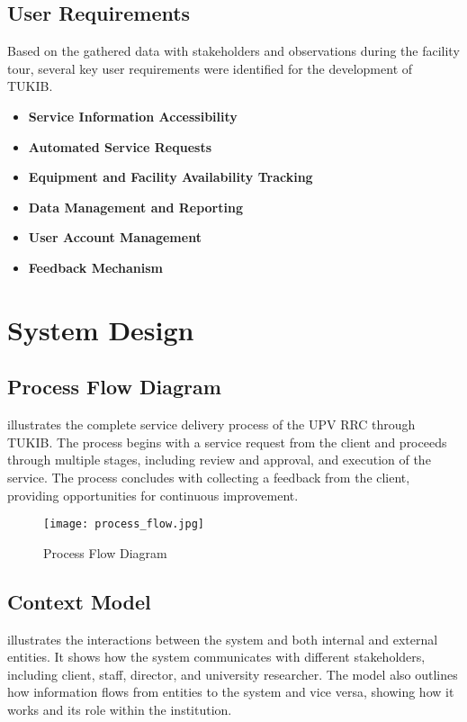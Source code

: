 \subsection{User Requirements}

Based on the gathered data with stakeholders and observations during the facility tour, several key user requirements were identified for the development of TUKIB. 

\begin{itemize}
	\item \textbf{Service Information Accessibility}
	\item \textbf{Automated Service Requests}
	\item \textbf{Equipment and Facility Availability Tracking}
	\item \textbf{Data Management and Reporting}
	\item \textbf{User Account Management}
	\item \textbf{Feedback Mechanism}
\end{itemize}

\newpage

\section{System Design}

\subsection{Process Flow Diagram}

 illustrates the complete service delivery process of the UPV RRC through TUKIB. The process begins with a service request from the client and proceeds through multiple stages, including review and approval, and execution of the service. The process concludes with collecting a feedback from the client, providing opportunities for continuous improvement.

\begin{figure}[h]
	\centering 
	\texttt{[image: process\_flow.jpg]}
	\caption{Process Flow Diagram}
	\label{fig:process_flow}
\end{figure}

\newpage

\subsection{Context Model}

 illustrates the interactions between the system and both internal and external entities. It shows how the system communicates with different stakeholders, including client, staff, director, and university researcher. The model also outlines how information flows from entities to the system and vice versa, showing how it works and its role within the institution.

